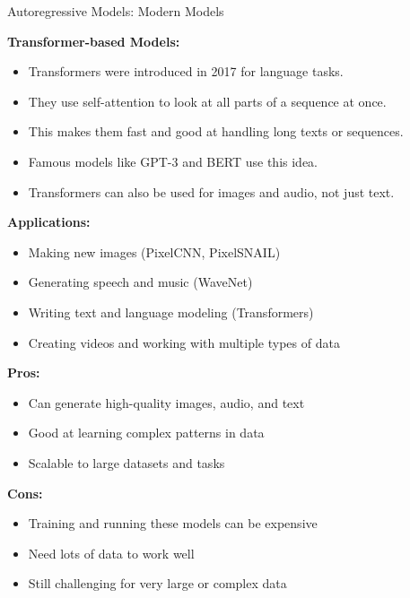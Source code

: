 \begin{frame}[allowframebreaks]{Autoregressive Models: Modern Models}
    \framebreak

    \textbf{Transformer-based Models:}
    \begin{itemize}
        \item Transformers were introduced in 2017 for language tasks.
        \item They use self-attention to look at all parts of a sequence at once.
        \item This makes them fast and good at handling long texts or sequences.
        \item Famous models like GPT-3 and BERT use this idea.
        \item Transformers can also be used for images and audio, not just text.
    \end{itemize}

    \framebreak

    \textbf{Applications:}
    \begin{itemize}
        \item Making new images (PixelCNN, PixelSNAIL)
        \item Generating speech and music (WaveNet)
        \item Writing text and language modeling (Transformers)
        \item Creating videos and working with multiple types of data
    \end{itemize}

    \framebreak

    \textbf{Pros:}
    \begin{itemize}
        \item Can generate high-quality images, audio, and text
        \item Good at learning complex patterns in data
        \item Scalable to large datasets and tasks
    \end{itemize}

    \textbf{Cons:}
    \begin{itemize}
        \item Training and running these models can be expensive
        \item Need lots of data to work well
        \item Still challenging for very large or complex data
    \end{itemize}
\end{frame}

